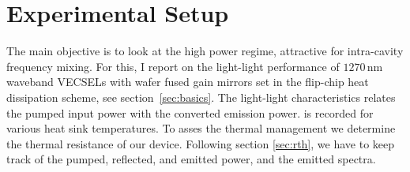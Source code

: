 \section{Experimental Setup}
\label{sec:exp}

The main objective
is to look at the high power regime,
attractive for intra-cavity frequency mixing.
For this,
I report on the light-light performance
of $1270\,\mathrm{nm}$ waveband VECSELs
with wafer fused gain mirrors
set in the flip-chip heat dissipation scheme,
see section~\ref{sec:basics}.
The light-light characteristics
relates the pumped input power
with the converted
emission power.
is recorded for various heat sink temperatures.
To asses the thermal management
we determine the thermal resistance
of our device.
Following section \ref{sec:rth},
we have to keep track of
the pumped,
reflected,
and emitted power,
and the emitted spectra.




